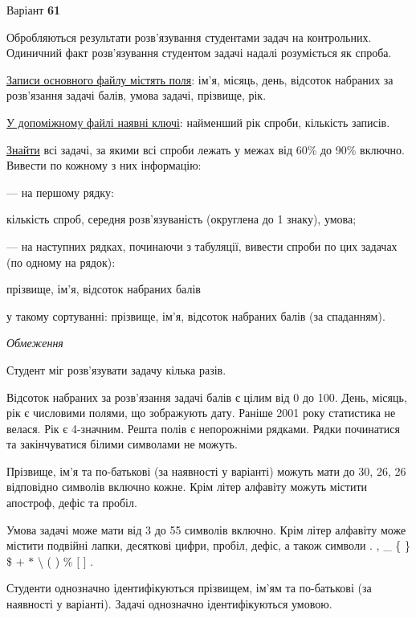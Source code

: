 \documentclass[11pt, ukrainian]{article}
\begin{document}
\par
\newpage
{\center Варіант  \No \textbf { 61 }\par}
\bigskip
Обробляються результати розв’язування студентами задач на контрольних.
Одиничний факт роз\-в’я\-зу\-вання студентом задачі надалі розуміється як спроба.

\underline{Записи основного файлу містять поля}: ім’я, місяць, день, відсоток набраних за розв’язання задачі балів, умова задачі, прізвище, рік.

\underline{У допоміжному файлі наявні ключі}: найменший рік спроби, кількість записів.

\underline{Знайти} всі задачі, за якими всі спроби лежать у межах від 60\% до 90\% включно. Вивести по кожному з них інформацію:\par
{\noindent}--- на першому рядку:\par
кількість спроб, середня розв’язуваність (округлена до 1 знаку), умова;

{\noindent}--- на наступних рядках, починаючи з табуляції, вивести спроби по цих задачах (по одному на рядок):\par
прізвище, ім’я, відсоток набраних балів

{\noindent}у такому сортуванні: прізвище, ім’я, відсоток набраних балів (за спаданням).


\bigskip\textit{Обмеження}

Студент міг розв’язувати задачу кілька разів.

Відсоток набраних за розв’язання задачі балів є цілим від 0 до 100.
День, місяць, рік є числовими полями, що зображують дату.
Раніше 2001 року статистика не велася. Рік є 4-значним.
Решта полів є непорожніми рядками.
Рядки починатися та закінчуватися білими символами не можуть.

Прізвище, ім’я та по-батькові (за наявності у варіанті) можуть мати до 30, 26, 26 відповідно символів включно кожне. 
Крім літер алфавіту можуть містити апостроф, дефіс та пробіл.

Умова задачі може мати від 3 до 55 символів включно.
Крім літер алфавіту може містити подвійні лапки, десяткові цифри, пробіл, дефіс,
а також символи . , \_ \{ \} \$ $+$ $*$ {\textbackslash} ( ) \% $[$ $]$ .

Студенти однозначно ідентифікуються прізвищем, ім’ям та по-батькові (за наявності у варіанті).
Задачі однозначно ідентифікуються умовою.
\end{document}
